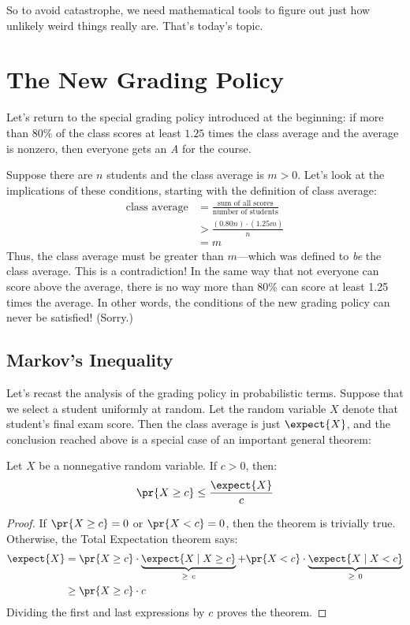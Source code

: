\begin{editingnotes}
So to avoid catastrophe, we need mathematical tools to figure out just
how unlikely weird things really are.  That's today's topic.

\section{The New Grading Policy}

Let's return to the special grading policy introduced at the
beginning: if more than 80\% of the class scores at least $1.25$ times
the class average and the average is nonzero, then everyone gets an
\textit{A} for the course.

Suppose there are $n$ students and the class average is $m > 0$.
Let's look at the implications of these conditions, starting with the
definition of class average:
%
\begin{align*}
\text{class average}
    & = \frac{\text{sum of all scores}}{\text{number of students}} \\[0.25ex]
    & > \frac{(0.80 n)\cdot(1.25 m)}{n} \\
    & = m
\end{align*}
%
Thus, the class average must be greater than $m$---which was defined
to \textit{be} the class average.  This is a contradiction!  In the
same way that not everyone can score above the average, there is no
way more than 80\% can score at least 1.25 times the average.  In
other words, the conditions of the new grading policy can never be
satisfied!  (Sorry.)

\subsection{Markov's Inequality}

Let's recast the analysis of the grading policy in probabilistic
terms.  Suppose that we select a student uniformly at random.  Let the
random variable $X$ denote that student's final exam score.  Then the
class average is just $\expect{X}$, and the conclusion reached above is a
special case of an important general theorem:

\begin{theorem}
Let $X$ be a nonnegative random variable.  If $c > 0$, then:
%
\[
\pr{X \geq c} \leq \frac{\expect{X}}{c}
\]
\end{theorem}

\begin{proof}
If $\pr{X \geq c} = 0$ or $\pr{X < c} = 0$, then the theorem is
trivially true.  Otherwise, the Total Expectation theorem says:
%
\begin{align*}
\expect{X} &
    = \pr{X \geq c} \cdot \underbrace{\expect{X \mid X \geq c}}_{\geq\ c}
    + \pr{X < c} \cdot \underbrace{\expect{X \mid X < c}}_{\geq\ 0} \\
  & \geq \pr{X \geq c} \cdot c
\end{align*}
%
Dividing the first and last expressions by $c$ proves the theorem.
\end{proof}


\end{editingnotes}
